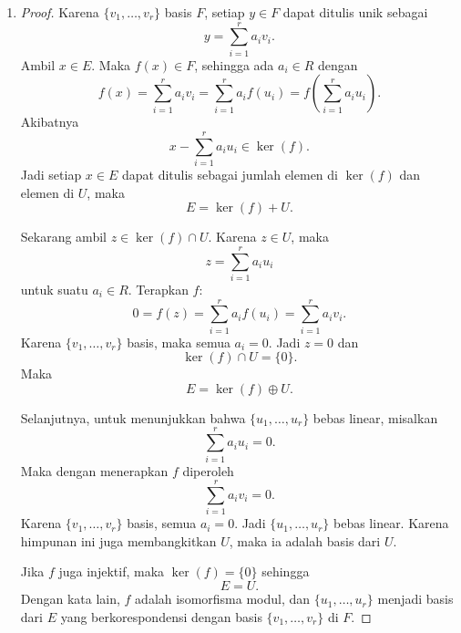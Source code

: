 \documentclass[11pt,a4paper]{article}
\begin{document}
\begin{enumerate}
\begin{proof}
          Tinggal ditunjukkan bahwa himpunan ini bebas linear. Jika
          \[
            \sum_{k=1}^n r_k b_{i_k} = 0,
          \]
          maka karena jumlahnya langsung, tiap komponen harus nol:
          \[
            r_k b_{i_k} = 0 \quad \text{untuk semua } k.
          \]
          Karena $Rb_{i_k} \cong R$, pemetaan $r \mapsto rb_{i_k}$ injektif, sehingga $r_k=0$ untuk semua $k$.

          Jadi $\{b_i\}_{i\in I}$ adalah basis bebas dan $M$ adalah modul bebas.
        \end{proof}

  \item         \begin{proof}
          Karena $\{v_1,\dots,v_r\}$ basis $F$, setiap $y \in F$ dapat ditulis unik sebagai
          \[
            y = \sum_{i=1}^r a_i v_i.
          \]
          Ambil $x \in E$. Maka $f(x) \in F$, sehingga ada $a_i \in R$ dengan
          \[
            f(x) = \sum_{i=1}^r a_i v_i = \sum_{i=1}^r a_i f(u_i) = f\!\left(\sum_{i=1}^r a_i u_i\right).
          \]
          Akibatnya
          \[
            x - \sum_{i=1}^r a_i u_i \in \ker(f).
          \]
          Jadi setiap $x \in E$ dapat ditulis sebagai jumlah elemen di $\ker(f)$ dan elemen di $U$, maka
          \[
            E = \ker(f) + U.
          \]

          Sekarang ambil $z \in \ker(f) \cap U$. Karena $z \in U$, maka
          \[
            z = \sum_{i=1}^r a_i u_i
          \]
          untuk suatu $a_i \in R$. Terapkan $f$:
          \[
            0 = f(z) = \sum_{i=1}^r a_i f(u_i) = \sum_{i=1}^r a_i v_i.
          \]
          Karena $\{v_1,\dots,v_r\}$ basis, maka semua $a_i=0$. Jadi $z=0$ dan
          \[
            \ker(f) \cap U = \{0\}.
          \]
          Maka
          \[
            E = \ker(f) \oplus U.
          \]

          Selanjutnya, untuk menunjukkan bahwa $\{u_1,\dots,u_r\}$ bebas linear, misalkan
          \[
            \sum_{i=1}^r a_i u_i = 0.
          \]
          Maka dengan menerapkan $f$ diperoleh
          \[
            \sum_{i=1}^r a_i v_i = 0.
          \]
          Karena $\{v_1,\dots,v_r\}$ basis, semua $a_i=0$. Jadi $\{u_1,\dots,u_r\}$ bebas linear. Karena himpunan ini juga membangkitkan $U$, maka ia adalah basis dari $U$.

          Jika $f$ juga injektif, maka $\ker(f)=\{0\}$ sehingga
          \[
            E = U.
          \]
          Dengan kata lain, $f$ adalah isomorfisma modul, dan $\{u_1,\dots,u_r\}$ menjadi basis dari $E$ yang berkorespondensi dengan basis $\{v_1,\dots,v_r\}$ di $F$.
        \end{proof}


\end{enumerate}
\end{document}
